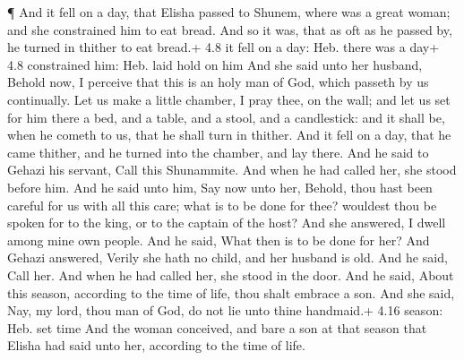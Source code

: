  ¶ And it fell on a day, that Elisha passed to Shunem, where
was a great woman; and she constrained him to eat bread. And so it was,
that as oft as he passed by, he turned in thither to eat bread.+ 4.8 it
fell on a day: Heb. there was a day+ 4.8 constrained him: Heb. laid hold
on him  And she said unto her husband, Behold now, I
perceive that this is an holy man of God, which passeth by us
continually.  Let us make a little chamber, I pray thee, on
the wall; and let us set for him there a bed, and a table, and a stool,
and a candlestick: and it shall be, when he cometh to us, that he shall
turn in thither.  And it fell on a day, that he came
thither, and he turned into the chamber, and lay there. 
And he said to Gehazi his servant, Call this Shunammite. And when he had
called her, she stood before him.  And he said unto him,
Say now unto her, Behold, thou hast been careful for us with all this
care; what is to be done for thee? wouldest thou be spoken for to the
king, or to the captain of the host? And she answered, I dwell among
mine own people.  And he said, What then is to be done for
her? And Gehazi answered, Verily she hath no child, and her husband is
old.  And he said, Call her. And when he had called her,
she stood in the door.  And he said, About this season,
according to the time of life, thou shalt embrace a son. And she said,
Nay, my lord, thou man of God, do not lie unto thine handmaid.+ 4.16
season: Heb. set time  And the woman conceived, and bare a
son at that season that Elisha had said unto her, according to the time
of life.

